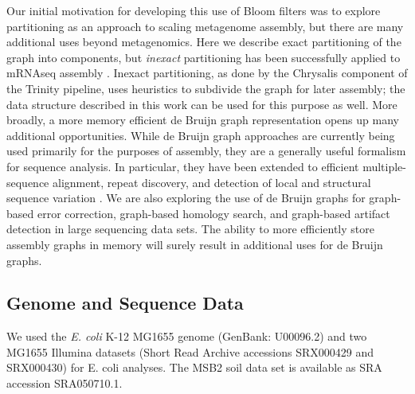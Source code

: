 \documentclass{pnastwo}
\begin{document}
\begin{article}
Our initial motivation for developing this use of Bloom filters was to
explore partitioning as an approach to scaling metagenome assembly,
but there are many additional uses beyond metagenomics.  Here we
describe exact partitioning of the graph into components, but {\em
  inexact} partitioning has been successfully applied to mRNAseq
assembly \cite{trinity}.  Inexact partitioning, as done by the
Chrysalis component of the Trinity pipeline, uses heuristics to
subdivide the graph for later assembly; the data structure described
in this work can be used for this purpose as well.  More broadly, a
more memory efficient de Bruijn graph representation opens up many
additional opportunities.  While de Bruijn graph approaches are
currently being used primarily for the purposes of assembly, they are
a generally useful formalism for sequence analysis. In particular,
they have been extended to efficient multiple-sequence alignment,
repeat discovery, and detection of local and structural sequence
variation \cite{zerbinothesis,zhang2003dna,price2005novo,cortex}.
We are also exploring the use of de Bruijn graphs for graph-based
error correction, graph-based homology search, and graph-based
artifact detection in large sequencing data sets.  The ability to more
efficiently store assembly graphs in memory will surely result in
additional uses for de Bruijn graphs.

\begin{materials}

\section{Genome and Sequence Data}
We used the \emph{E. coli} K-12 MG1655 genome (GenBank: U00096.2) and
two MG1655 Illumina datasets (Short Read Archive accessions SRX000429
and SRX000430) for E. coli analyses.  The MSB2 soil data set is
available as SRA accession SRA050710.1.


\end{materials}
\end{article}
\end{document}
